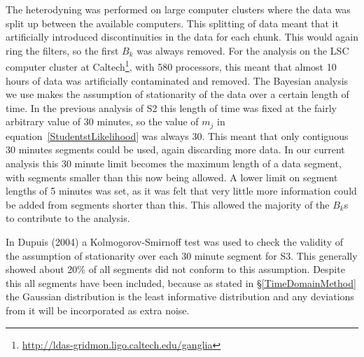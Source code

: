 The heterodyning was performed on large computer clusters where the data was split up between the
available computers. This splitting of data meant that it artificially introduced discontinuities in
the data for each chunk. This would again ring the filters, so the first $B_k$ was always
removed. For the analysis on the LSC computer cluster at
Caltech\footnote{\url{http://ldas-gridmon.ligo.caltech.edu/ganglia}}, with 580 processors, this
meant that almost 10 hours of data was artificially contaminated and removed.
The Bayesian analysis we use makes the assumption of stationarity of the data over a certain length
of time. In the previous analysis of S2 \cite{Abbott:2005} this length of time was fixed at the
fairly arbitrary value of 30 minutes, so the value of $m_j$ in equation~\ref{StudentstLikelihood}
was always 30. This meant that only contiguous 30 minutes segments could be used, again discarding
more data. In our current analysis this 30 minute limit becomes the maximum length of a data
segment, with segments smaller than this now being allowed. A lower limit on segment lengths of
5 minutes was set, as it was felt that very little more information could be added from segments
shorter than this. This allowed the majority of the $B_k$s to contribute to the analysis.

In Dupuis (2004) \cite{Dupuis:2004} a Kolmogorov-Smirnoff test was used to check the validity of the
assumption of stationarity over each 30 minute segment for S3. This generally showed about 20\% of
all segments did not conform to this assumption. Despite this all segments have been included,
because as stated in \S\ref{TimeDomainMethod} the Gaussian distribution is the least informative
distribution and any deviations from it will be incorporated as extra noise.


